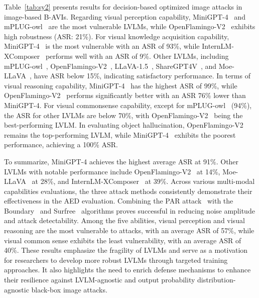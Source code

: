 Table~\ref{tab:sy2} presents results for decision-based optimized image attacks in image-based B-AVIs.
Regarding visual perception capability, MiniGPT-4~\cite{zhu2023minigpt} and mPLUG-owl~\cite{ye2023mplug} are the most vulnerable LVLMs, while OpenFlamingo-V2~\cite{openfamingov2} exhibits high robustness (ASR: 21\%).
For visual knowledge acquisition capability, MiniGPT-4~\cite{zhu2023minigpt} is the most vulnerable with an ASR of 93\%, while InternLM-XComposer~\cite{zhang2023internlm} performs well with an ASR of 9\%. Other LVLMs, including mPLUG-owl~\cite{ye2023mplug}, OpenFlamingo-V2~\cite{openfamingov2}, LLaVA-1.5~\cite{liu2023improved}, ShareGPT4V~\cite{chen2023sharegpt4v}, and Moe-LLaVA~\cite{lin2024moe}, have ASR below 15\%, indicating satisfactory performance.
In terms of visual reasoning capability, MiniGPT-4~\cite{zhu2023minigpt} has the highest ASR of 99\%, while OpenFlamingo-V2~\cite{openfamingov2} performs significantly better with an ASR 76\% lower than MiniGPT-4.
For visual commonsense capability, except for mPLUG-owl~\cite{ye2023mplug} (94\%), the ASR for other LVLMs are below 70\%, with OpenFlamingo-V2~\cite{openfamingov2} being the best-performing LVLM.
In evaluating object hallucination, OpenFlamingo-V2~\cite{openfamingov2} remains the top-performing LVLM, while MiniGPT-4~\cite{zhu2023minigpt} exhibits the poorest performance, achieving a 100\% ASR.

To summarize, MiniGPT-4 achieves the highest average ASR at 91\%. Other LVLMs with notable performance include OpenFlamingo-V2~\cite{openfamingov2} at 14\%, Moe-LLaVA~\cite{lin2024moe} at 28\%, and InternLM-XComposer~\cite{zhang2023internlm} at 39\%. Across various multi-modal capabilities evaluations, the three attack methods consistently demonstrate their effectiveness in the AED evaluation. Combining the PAR attack~\cite{shi2022decision} with the Boundary~\cite{brendel2017decision} and Surfree~\cite{maho2021surfree} algorithms proves successful in reducing noise amplitude and attack detectability.
Among the five abilities, visual perception and visual reasoning are the most vulnerable to attacks, with an average ASR of 57\%, while visual common sense exhibits the least vulnerability, with an average ASR of 40\%. These results emphasize the fragility of LVLMs and serve as a motivation for researchers to develop more robust LVLMs through targeted training approaches. It also highlights the need to enrich defense mechanisms to enhance their resilience against LVLM-agnostic and output probability distribution-agnostic black-box image attacks.

